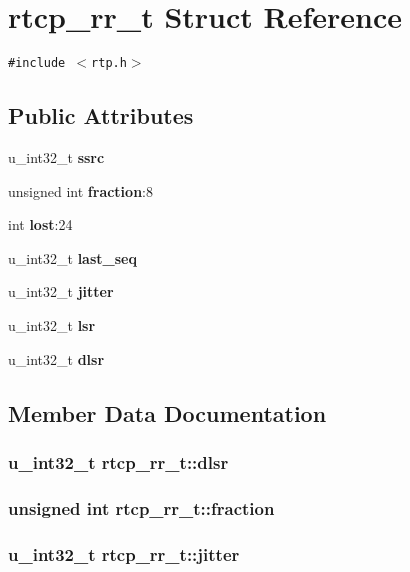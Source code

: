\section{rtcp\_\-rr\_\-t Struct Reference}
\label{structrtcp__rr__t}
{\tt \#include $<$rtp.h$>$}

\subsection*{Public Attributes}
\begin{CompactItemize}
\item 
u\_\-int32\_\-t {\bf ssrc}
\item 
unsigned int {\bf fraction}:8
\item 
int {\bf lost}:24
\item 
u\_\-int32\_\-t {\bf last\_\-seq}
\item 
u\_\-int32\_\-t {\bf jitter}
\item 
u\_\-int32\_\-t {\bf lsr}
\item 
u\_\-int32\_\-t {\bf dlsr}
\end{CompactItemize}


\subsection{Member Data Documentation}
\subsubsection{\setlength{\rightskip}{0pt plus 5cm}u\_\-int32\_\-t {\bf rtcp\_\-rr\_\-t::dlsr}}\label{structrtcp__rr__t_o6}


\subsubsection{\setlength{\rightskip}{0pt plus 5cm}unsigned int {\bf rtcp\_\-rr\_\-t::fraction}}\label{structrtcp__rr__t_o1}


\subsubsection{\setlength{\rightskip}{0pt plus 5cm}u\_\-int32\_\-t {\bf rtcp\_\-rr\_\-t::jitter}}\label{structrtcp__rr__t_o4}


